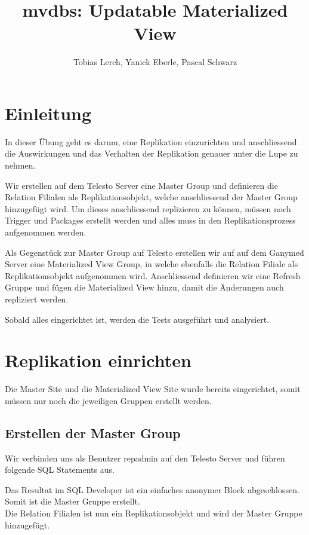 \documentclass[11pt,a4paper,parskip=half]{scrartcl}
\title{mvdbs: Updatable Materialized View}
\author{Tobias Lerch, Yanick Eberle, Pascal Schwarz}
\begin{document}
\maketitle

\section{Einleitung}
In dieser Übung geht es darum, eine Replikation einzurichten und anschliessend die Auswirkungen und das Verhalten der Replikation genauer unter die Lupe zu nehmen.

Wir erstellen auf dem Telesto Server eine Master Group und definieren die Relation Filialen als Replikationsobjekt, welche anschliessend der Master Group hinzugefügt wird. Um dieses anschliessend replizieren zu können, müssen noch Trigger und Packages erstellt werden und alles muss in den Replikationsprozess aufgenommen werden.

Als Gegenstück zur Master Group auf Telesto erstellen wir auf auf dem Ganymed Server eine Materialized View Group, in welche ebenfalls die Relation Filiale als Replikationsobjekt aufgenommen wird. Anschliessend definieren wir eine Refresh Gruppe und fügen die Materialized View hinzu, damit die Änderungen auch repliziert werden.

Sobald alles eingerichtet ist, werden die Tests ausgeführt und analysiert.

\section{Replikation einrichten}
Die Master Site und die Materialized View Site wurde bereits eingerichtet, somit müssen nur noch die jeweiligen Gruppen erstellt werden.
\subsection{Erstellen der Master Group}
Wir verbinden uns als Benutzer repadmin auf den Telesto Server und führen folgende SQL Statements aus.

 
Das Resultat im SQL Developer ist ein einfaches \glqq{}anonymer Block abgeschlossen\grqq{}. Somit ist die Master Gruppe erstellt.\\


Die Relation Filialen ist nun ein Replikationsobjekt  und wird der Master Gruppe hinzugefügt. \\
\end{document}
